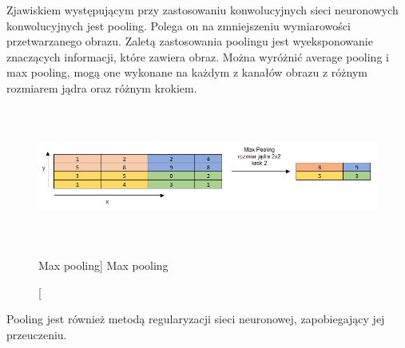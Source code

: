 \documentclass[a4paper,12pt]{article}
\begin{document}
	    \par Zjawiskiem występującym przy zastosowaniu konwolucyjnych sieci neuronowych konwolucyjnych jest pooling.
	    Polega on na zmniejszeniu wymiarowości przetwarzanego obrazu. Zaletą zastosowania poolingu jest wyeksponowanie znaczących informacji, które zawiera obraz. Można wyróżnić average pooling i max pooling, mogą one wykonane na każdym z kanałów obrazu z różnym rozmiarem jądra oraz różnym krokiem. 
	 
	    \begin{figure}[!ht]
            \centering
                \includegraphics[width=17cm, height=4.5cm]{image//maxPoolingImg.png}
                \caption
                [Max pooling]
                {Max pooling}
        \end{figure}

        \newpage
        
        Pooling jest również metodą regularyzacji sieci neuronowej, zapobiegający jej przeuczeniu. 
        
\end{document}
